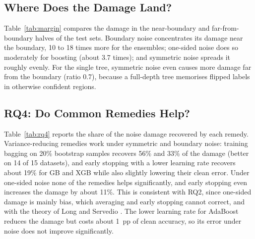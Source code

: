 \documentclass[conference,a4paper]{IEEEtran}
\begin{document}
\begin{table}[!t]
\caption{Variance Added by the Noise Realisation and by Sampling (pp, 20\% Noise)}
\label{tab:rq3}
\centering
\footnotesize
\setlength{\tabcolsep}{4pt}

\end{table}

\subsection{Where Does the Damage Land?}
Table~\ref{tab:margin} compares the damage in the near-boundary and far-from-boundary halves of the test sets. Boundary noise concentrates its damage near the boundary, 10 to 18 times more for the ensembles; one-sided noise does so moderately for boosting (about 3.7 times); and symmetric noise spreads it roughly evenly. For the single tree, symmetric noise even causes more damage far from the boundary (ratio 0.7), because a full-depth tree memorises flipped labels in otherwise confident regions.

\begin{table}[!t]
\caption{Ratio of Damage Near vs.\ Far From the Decision Boundary (20\% Noise)}
\label{tab:margin}
\centering
\footnotesize

\end{table}

\subsection{RQ4: Do Common Remedies Help?}
Table~\ref{tab:rq4} reports the share of the noise damage recovered by each remedy. Variance-reducing remedies work under symmetric and boundary noise: training bagging on 20\% bootstrap samples recovers 56\% and 33\% of the damage (better on 14 of 15 datasets), and early stopping with a lower learning rate recovers about 19\% for GB and XGB while also slightly lowering their clean error. Under one-sided noise none of the remedies helps significantly, and early stopping even increases the damage by about 11\%. This is consistent with RQ2, since one-sided damage is mainly bias, which averaging and early stopping cannot correct, and with the theory of Long and Servedio \cite{long2010}. The lower learning rate for AdaBoost reduces the damage but costs about 1~pp of clean accuracy, so its error under noise does not improve significantly.

\begin{table}[!t]
\caption{Share of Noise Damage Recovered by Each Remedy (20\% Noise). $^{*}$: Noisy Error Significantly Lower, $p<0.05$}
\label{tab:rq4}
\centering
\footnotesize

\end{table}
\end{document}
